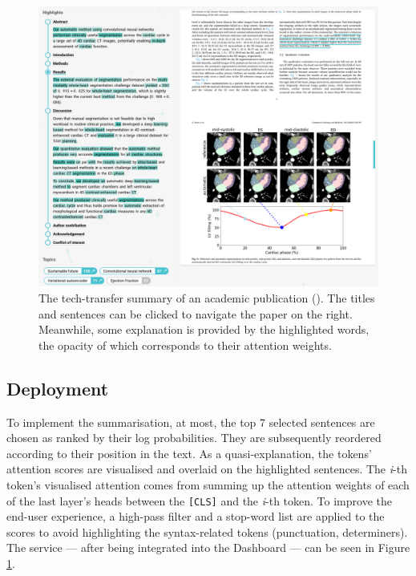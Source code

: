 \begin{figure}[t]
    \centering
    \includegraphics[width=\linewidth]{figures/dashboard-highlights.png}
    \captionsetup{width=.9\linewidth}
    \caption{The tech-transfer summary of an academic publication (\cite{bruns2022deep}). The titles and sentences can be clicked to navigate the paper on the right. Meanwhile, some explanation is provided by the highlighted words, the opacity of which corresponds to their attention weights.}
    \label{fig:dashboard-highlights}
\end{figure}

\subsection{Deployment}

To implement the summarisation, at most, the top 7 selected sentences are chosen as ranked by their log probabilities. They are subsequently reordered according to their position in the text. As a quasi-explanation, the tokens' attention scores are visualised and overlaid on the highlighted sentences. The \textit{i}-th token's visualised attention comes from summing up the attention weights of each of the last layer's heads between the \texttt{[CLS]} and the \textit{i}-th token. To improve the end-user experience, a high-pass filter and a stop-word list are applied to the scores to avoid highlighting the syntax-related tokens (punctuation, determiners). The service --- after being integrated into the Dashboard --- can be seen in Figure \ref{fig:dashboard-highlights}.

